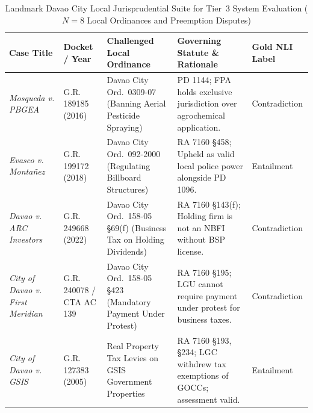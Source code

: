     \begin{table}[!htbp]
        \centering
        \footnotesize
        \setlength{\tabcolsep}{2.2pt}
        \renewcommand{\arraystretch}{0.92}
        \caption[Landmark Davao City Local Jurisprudential Evaluation Suite]{Landmark Davao City Local Jurisprudential Suite for Tier~3 System Evaluation ($N = 8$ Local Ordinances and Preemption Disputes)}
        \label{tab:tier3_cases}
        \begin{tabularx}{\linewidth}{>{\RaggedRight\arraybackslash}p{2.35cm}>{\centering\arraybackslash}p{1.75cm}>{\RaggedRight\arraybackslash}p{2.8cm}>{\RaggedRight\arraybackslash}X>{\centering\arraybackslash}p{2.2cm}}
            \toprule
            \textbf{Case Title} & \textbf{Docket / Year} & \textbf{Challenged Local Ordinance} & \textbf{Governing Statute \& Rationale} & \textbf{Gold NLI Label} \\
            \midrule
            \textit{Mosqueda v. PBGEA}~\cite{scp2016mosqueda} & G.R. 189185 \newline (2016) & Davao City Ord.~0309-07 (Banning Aerial Pesticide Spraying) & PD 1144; FPA holds exclusive jurisdiction over agrochemical application. & Contradiction \\
            \addlinespace[2pt]
            \textit{Evasco v. Monta{\~n}ez}~\cite{scp2018evascovmontanez} & G.R. 199172 \newline (2018) & Davao City Ord.~092-2000 (Regulating Billboard Structures) & RA 7160 §458; Upheld as valid local police power alongside PD 1096. & Entailment \\
            \addlinespace[2pt]
            \textit{Davao v. ARC Investors}~\cite{scp2022davaovarc} & G.R. 249668 \newline (2022) & Davao City Ord.~158-05 §69(f) (Business Tax on Holding Dividends) & RA 7160 §143(f); Holding firm is not an NBFI without BSP license. & Contradiction \\
            \addlinespace[2pt]
            \textit{City of Davao v. First Meridian}~\cite{scp2022firstmeridian, ctarocksteel139} & G.R. 240078 / CTA AC 139 & Davao City Ord.~158-05 §423 (Mandatory Payment Under Protest) & RA 7160 §195; LGU cannot require payment under protest for business taxes. & Contradiction \\
            \addlinespace[2pt]
            \textit{City of Davao v. GSIS}~\cite{scp2005davaovgsis} & G.R. 127383 \newline (2005) & Real Property Tax Levies on GSIS Government Properties & RA 7160 §193, §234; LGC withdrew tax exemptions of GOCCs; assessment valid. & Entailment \\

\end{tabularx}
\end{table}
